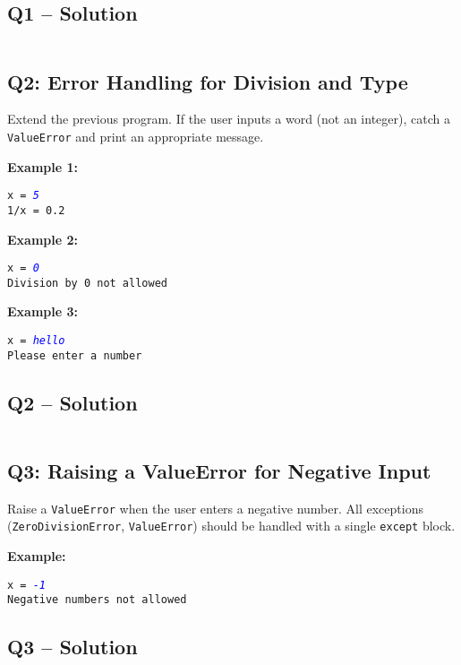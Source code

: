 \documentclass[a4paper,11pt]{article}
\begin{document}
\subsection*{Q1 – Solution}
\inputminted{python}{Files/13/1.py}

\subsection*{Q2: Error Handling for Division and Type}
Extend the previous program. If the user inputs a word (not an integer), catch a \texttt{ValueError} and print an appropriate message.

\textbf{Example 1:}
\begin{flushleft}
	\texttt{x = \textcolor{blue}{\textit{5}}}\\
	\texttt{1/x = 0.2}
\end{flushleft}

\textbf{Example 2:}
\begin{flushleft}
	\texttt{x = \textcolor{blue}{\textit{0}}}\\
	\texttt{Division by 0 not allowed}
\end{flushleft}

\textbf{Example 3:}
\begin{flushleft}
	\texttt{x = \textcolor{blue}{\textit{hello}}}\\
	\texttt{Please enter a number}
\end{flushleft}


\subsection*{Q2 – Solution}
\inputminted{python}{Files/13/2.py}


\subsection*{Q3: Raising a ValueError for Negative Input}
Raise a \texttt{ValueError} when the user enters a negative number. All exceptions (\texttt{ZeroDivisionError}, \texttt{ValueError}) should be handled with a single \texttt{except} block.

\textbf{Example:}
\begin{flushleft}
	\texttt{x = \textcolor{blue}{\textit{-1}}}\\
	\texttt{Negative numbers not allowed}
\end{flushleft}

\subsection*{Q3 – Solution}
\inputminted{python}{Files/13/3.py}
	
\end{document}
